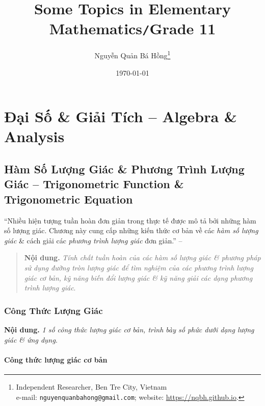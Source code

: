 \documentclass[oneside]{book}
\title{Some Topics in Elementary Mathematics\texttt{/}Grade 11}
\author{Nguyễn Quản Bá Hồng\footnote{Independent Researcher, Ben Tre City, Vietnam\\e-mail: \texttt{nguyenquanbahong@gmail.com}; website: \url{https://nqbh.github.io}.}}
\date{\today}
\numberwithin{equation}{section}
\begin{document}
\frontmatter
\maketitle
\setcounter{secnumdepth}{4}
\setcounter{tocdepth}{3}
\tableofcontents
\newpage


\mainmatter

\part{Đại Số \& Giải Tích -- Algebra \& Analysis}

\chapter{Hàm Số Lượng Giác \& Phương Trình Lượng Giác -- Trigonometric Function \& Trigonometric Equation}

``Nhiều hiện tượng tuần hoàn đơn giản trong thực tế được mô tả bởi những hàm số lượng giác. Chương này cung cấp những kiến thức cơ bản về các \textit{hàm số lượng giác} \& cách giải các \textit{phương trình lượng giác} đơn giản.'' -- \cite[p. 3]{SGK_Toan_11_dai_so_giai_tich_nang_cao}

\begin{quotation}
	\textbf{Nội dung.} \textit{Tính chất tuần hoàn của các hàm số lượng giác \& phương pháp sử dụng đường tròn lượng giác để tìm nghiệm của các phương trình lượng giác cơ bản, kỹ năng biến đổi lượng giác \& kỹ năng giải các dạng phương trình lượng giác}.
\end{quotation}

\section{Công Thức Lượng Giác}
\textbf{Nội dung.} \textit{1 số công thức lượng giác cơ bản, trình bày số phức dưới dạng lượng giác \& ứng dụng}.

\subsection{Công thức lượng giác cơ bản}
\end{document}

